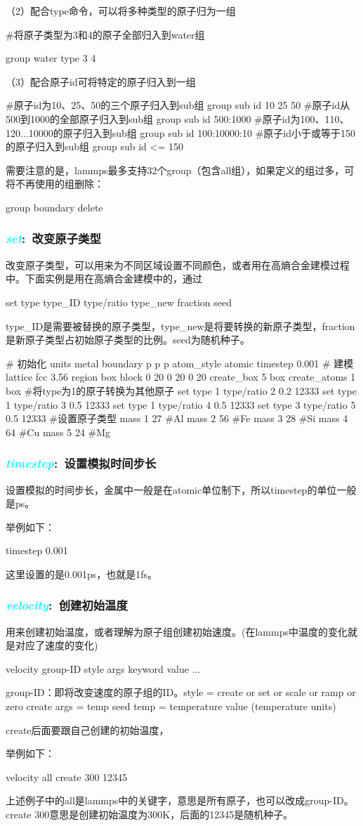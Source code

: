 {（2）配合type命令，可以将多种类型的原子归为一组

#将原子类型为3和4的原子全部归入到water组

group water type 3 4

（3）配合原子id可将特定的原子归入到一组

#原子id为10、25、50的三个原子归入到sub组
group sub id 10 25 50
#原子id从500到1000的全部原子归入到sub组
group sub id 500:1000
#原子id为100、110、120...10000的原子归入到sub组
group sub id 100:10000:10
#原子id小于或等于150的原子归入到sub组
group sub id <= 150

需要注意的是，lammps最多支持32个group（包含all组），如果定义的组过多，可将不再使用的组删除：

group boundary delete
}

\frame
{
	\frametitle{\textcolor{cyan}{\textit{set}}:~改变原子类型}
	改变原子类型，可以用来为不同区域设置不同颜色，或者用在高熵合金建模过程中。下面实例是用在高熵合金建模中的，通过

set type type_ID type/ratio type_new fraction seed

type_ID是需要被替换的原子类型，type_new是将要转换的新原子类型，fraction是新原子类型占初始原子类型的比例。seed为随机种子。

# 初始化
units         metal
boundary      p p p
atom_style    atomic
timestep      0.001
# 建模
lattice       fcc 3.56
region        box block 0 20 0 20 0 20
create_box    5 box
create_atoms    1 box
#将type为1的原子转换为其他原子
set    type 1 type/ratio 2 0.2 12333
set    type 1 type/ratio 3 0.5 12333
set    type 1 type/ratio 4 0.5 12333
set    type 3 type/ratio 5 0.5 12333
#设置原子类型
mass    1 27 #Al
mass    2 56 #Fe
mass    3 28 #Si
mass    4 64 #Cu
mass    5 24 #Mg
}

\frame
{
	\frametitle{\textcolor{cyan}{\textit{timestep}}:~设置模拟时间步长}
	设置模拟的时间步长，金属中一般是在atomic单位制下，所以timestep的单位一般是ps。

举例如下：

timestep 0.001

这里设置的是0.001ps，也就是1fs。
}

\frame
{
	\frametitle{\textcolor{cyan}{\textit{velocity}}:~创建初始温度}
	用来创建初始温度，或者理解为原子组创建初始速度。(在lammps中温度的变化就是对应了速度的变化)

velocity group-ID style args keyword value ...

    group-ID：即将改变速度的原子组的ID。style = create or set or scale or ramp or zero
        create args = temp seed temp = temperature value (temperature units)

create后面要跟自己创建的初始温度，

举例如下：

velocity all create 300 12345

上述例子中的all是lammps中的关键字，意思是所有原子，也可以改成group-ID。create 300意思是创建初始温度为300K，后面的12345是随机种子。
}

